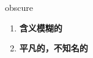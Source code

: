 
\begin{frame}
{\huge obscure}
\begin{center}
\begin{enumerate}\Large
  \item \textbf{含义模糊的}
  \item \textbf{平凡的，不知名的}
\end{enumerate}
\end{center}
\end{frame}
